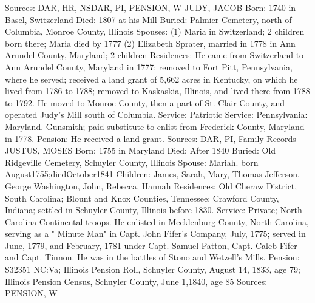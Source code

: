 Sources: DAR, HR, NSDAR, PI, PENSION, W 
JUDY, JACOB
Born: 1740 in Basel, Switzerland
Died: 1807 at his Mill 
Buried: Palmier Cemetery, north of Columbia, Monroe County, Illinois 
Spouses: (1) Maria in Switzerland; 2 children born there; Maria died by 1777 
    (2) Elizabeth Sprater, married in 1778 in Ann Arundel County, Mary­land; 2 children 
Residences: He came from Switzerland to Ann Arundel County, Maryland in 1777; removed to Fort Pitt, Pennsylvania, where he served; received a land grant of 5,662 acres in Kentucky, on which he lived from 1786 to 1788; removed to Kaskaskia, Illinois, and lived there from 1788 to 1792. He moved to Monroe County, then a part of St. Clair County, and operated Judy's Mill south of Columbia. 
Service: Patriotic
Service: Pennsylvania: Maryland. Gunsmith; paid substitute to enlist from Frederick County, Maryland in 1778.
Pension: He received a land grant.
Sources: DAR, PI, Family Records 
JUSTUS, MOSES
Born: 1755 in Maryland
Died: After 1840 Buried: Old Ridgeville Cemetery, Schuyler County, Illinois 
Spouse: Mariah. born August1755;diedOctober1841 Children: James, Sarah, Mary, Thomas Jefferson, George Washington, John, Rebecca, Hannah Residences: Old Cheraw District, South Carolina; Blount and Knox Counties, Tennessee; Crawford County, Indiana; settled in Schuyler County, Illinois before 1830. 
Service: Private; North Carolina Continental troops. He enlisted in Mecklenburg County, North Carolina, serving as a " Minute Man" in Capt. John Fifer's Company, July, 1775; served in June, 1779, and February, 1781 under Capt. Samuel Patton, Capt. Caleb Fifer and Capt. Tinnon. He was in the battles of  Stono and Wetzell's Mills.
Pension: S32351 NC:Va; Illinois Pension Roll, Schuyler County, August 14, 1833, age 79; Illinois Pension Census, Schuyler County, June 1,1840, age 85 
Sources: PENSION, W 

